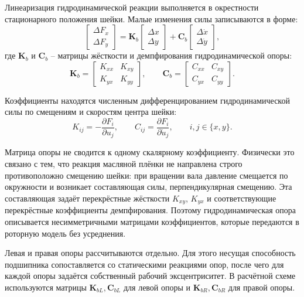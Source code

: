 Линеаризация гидродинамической реакции выполняется в окрестности стационарного положения шейки. Малые изменения силы записываются в форме:
\begin{equation}
    \begin{bmatrix}\Delta F_x\\ \Delta F_y\end{bmatrix}=
    \mathbf{K}_b
    \begin{bmatrix}\Delta x\\ \Delta y\end{bmatrix}+
    \mathbf{C}_b
    \begin{bmatrix}\Delta \dot{x}\\ \Delta \dot{y}\end{bmatrix},
    \label{eq:bearing_linear_force}
\end{equation}
где $\mathbf{K}_b$ и $\mathbf{C}_b$ -- матрицы жёсткости и демпфирования гидродинамической опоры:
\begin{equation}
    \mathbf{K}_b=\begin{bmatrix}K_{xx}&K_{xy}\\K_{yx}&K_{yy}\end{bmatrix},\qquad
    \mathbf{C}_b=\begin{bmatrix}C_{xx}&C_{xy}\\C_{yx}&C_{yy}\end{bmatrix}.
    \label{eq:bearing_matrices}
\end{equation}

Коэффициенты находятся численным дифференцированием гидродинамической силы по смещениям и скоростям центра шейки:
\begin{equation}
    K_{ij}=-\frac{\partial F_i}{\partial u_j},\qquad
    C_{ij}=\frac{\partial F_i}{\partial \dot{u}_j},\qquad i,j\in\{x,y\}.
    \label{eq:coefficients_derivatives}
\end{equation}

Матрица опоры не сводится к одному скалярному коэффициенту. Физически это связано с тем, что реакция масляной плёнки не направлена строго противоположно смещению шейки: при вращении вала давление смещается по окружности и возникает составляющая силы, перпендикулярная смещению. Эта составляющая задаёт перекрёстные жёсткости $K_{xy}$, $K_{yx}$ и соответствующие перекрёстные коэффициенты демпфирования. Поэтому гидродинамическая опора описывается несимметричными матрицами коэффициентов, которые передаются в роторную модель без усреднения.

Левая и правая опоры рассчитываются отдельно. Для этого несущая способность подшипника сопоставляется со статическими реакциями опор, после чего для каждой опоры задаётся собственный рабочий эксцентриситет. В расчётной схеме используются матрицы $\mathbf{K}_{bL},\mathbf{C}_{bL}$ для левой опоры и $\mathbf{K}_{bR},\mathbf{C}_{bR}$ для правой опоры.

